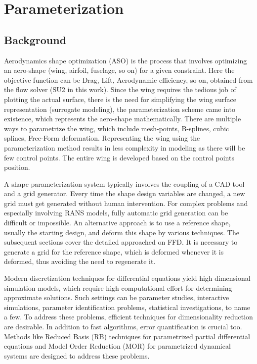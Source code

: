 \chapter{Parameterization}
\label{parameterization}
\section{Background}
Aerodynamics shape optimization (ASO) is the process that involves optimizing an aero-shape (wing, airfoil, fuselage, so on) for a given constraint. Here the objective function can be Drag, Lift, Aerodynamic efficiency, so on, obtained from the flow solver (SU2 in this work). Since the wing requires the tedious job of plotting the actual surface, there is the need for simplifying the wing surface representation (surrogate modeling), the parameterization scheme came into existence, which represents the aero-shape mathematically. There are multiple ways to parametrize the wing, which include mesh-points, B-splines, cubic splines, Free-Form deformation. Representing the wing using the parameterization method results in less complexity in modeling as there will be few control points. The entire wing is developed based on the control points position. 

A shape parameterization system typically involves the coupling of a CAD tool and a grid generator. Every time the shape design variables are changed, a new grid must get generated without human intervention. For complex problems and especially involving RANS models, fully automatic grid generation can be difficult or impossible. An alternative approach is to use a reference shape, usually the starting design, and deform this shape by various techniques. The subsequent sections cover the detailed approached on FFD. It is necessary to generate a grid for the reference shape, which is deformed whenever it is deformed, thus avoiding the need to regenerate it.

Modern discretization techniques for differential equations yield high dimensional simulation models, which require high computational effort for determining approximate solutions. Such settings can be parameter studies, interactive simulations, parameter identification problems, statistical investigations, to name a few. To address these problems, efficient techniques for dimensionality reduction are desirable. In addition to fast algorithms, error quantification is crucial too. Methods like Reduced Basis (RB) techniques for parametrized partial differential equations and Model Order Reduction (MOR) for parametrized dynamical systems are designed to address these problems. 

